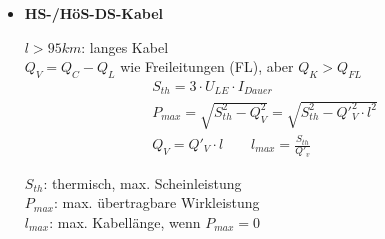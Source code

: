 \begin{itemize}
\item[] \textbf{HS-/HöS-DS-Kabel}

    $l>95km$: langes Kabel\\
    $Q_V = Q_C - Q_L$ wie Freileitungen (FL), aber $Q_K > Q_{FL}$
    \begin{gather*}
        S_{th}= 3\cdot U_{LE}\cdot I_{Dauer}\\
        P_{max}= \sqrt{S^2_{th}-Q^2_V} = \sqrt{S^2_{th} - Q'^2_V \cdot l^2}\\
        Q_V = Q'_V \cdot l \qquad l_{max}= \frac{S_{th}}{Q'_v}
    \end{gather*}

    $S_{th}$: thermisch, max. Scheinleistung\\
    $P_{max}$: max. übertragbare Wirkleistung\\
    $l_{max}$: max. Kabellänge, wenn $P_{max} = 0$

\end{itemize}
